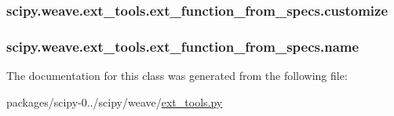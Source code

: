 \subsubsection[{customize}]{\setlength{\rightskip}{0pt plus 5cm}scipy.\+weave.\+ext\+\_\+tools.\+ext\+\_\+function\+\_\+from\+\_\+specs.\+customize}\label{classscipy_1_1weave_1_1ext__tools_1_1ext__function__from__specs_a12c516424b747cce16a0a82c6bfe4531}
\hypertarget{classscipy_1_1weave_1_1ext__tools_1_1ext__function__from__specs_abb94d409d38ea8d1ff96091ed655fb3a}{}
\subsubsection[{name}]{\setlength{\rightskip}{0pt plus 5cm}scipy.\+weave.\+ext\+\_\+tools.\+ext\+\_\+function\+\_\+from\+\_\+specs.\+name}\label{classscipy_1_1weave_1_1ext__tools_1_1ext__function__from__specs_abb94d409d38ea8d1ff96091ed655fb3a}


The documentation for this class was generated from the following file\+:\begin{DoxyCompactItemize}
\item 
packages/scipy-\/0../scipy/weave/\hyperlink{ext__tools_8py}{ext\+\_\+tools.\+py}\end{DoxyCompactItemize}
